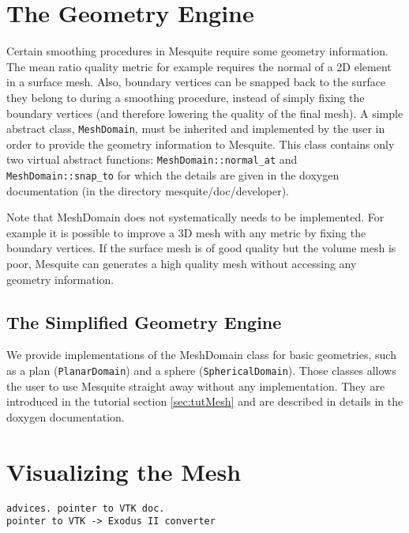\section{The Geometry Engine}
\label{sec:geometry}

Certain smoothing procedures in Mesquite require some geometry information. The mean ratio quality
metric for example requires the normal of a 2D element in a surface mesh. Also, boundary
vertices can be snapped back to the surface they belong to during a smoothing procedure, instead of
simply fixing the boundary vertices (and therefore lowering the quality of the final mesh). A simple abstract
class, \texttt{MeshDomain}, must be inherited and implemented by the user in order to provide the
geometry information to Mesquite.  This class contains only two virtual abstract functions:
\texttt{MeshDomain::normal\_at} and \texttt{MeshDomain::snap\_to} for which the details are given in
the doxygen documentation (in the directory mesquite/doc/developer).

Note that MeshDomain does not systematically needs to be implemented. For example it is possible to
improve a 3D mesh with any metric by fixing the boundary vertices. If the surface mesh is of good
quality but the volume mesh is poor, Mesquite can generates a high quality mesh without accessing
any geometry information. 


\subsection{The Simplified Geometry Engine}

We provide implementations of the MeshDomain class for basic geometries, such as a plan
(\texttt{PlanarDomain}) and a sphere (\texttt{SphericalDomain}). Those classes allows the user to use
Mesquite straight away without any implementation. They are introduced in the tutorial section
\ref{sec:tutMesh} and are described in details in the doxygen documentation.

\section{Visualizing the Mesh}

\begin{verbatim}
advices. pointer to VTK doc. 
pointer to VTK -> Exodus II converter
\end{verbatim}
